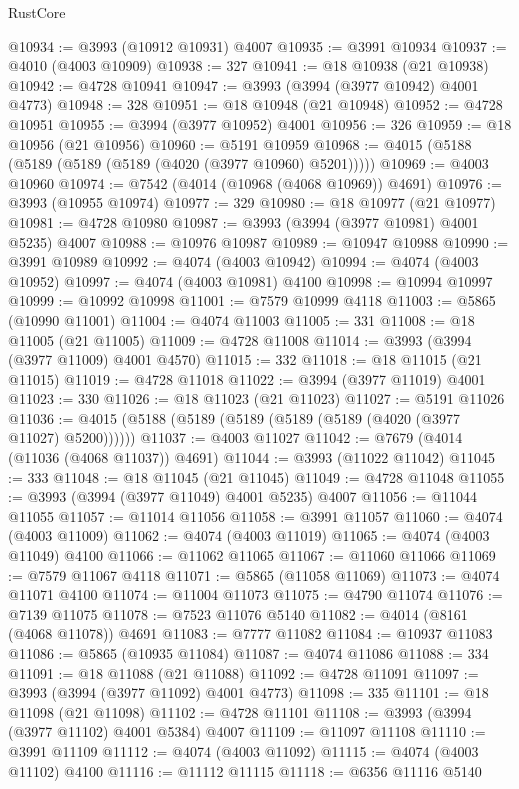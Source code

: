 \begin{lexlean}{RustCore}
\begin{coremodule}
@10934 := @3993 (@10912 @10931) @4007
@10935 := @3991 @10934
@10937 := @4010 (@4003 @10909)
@10938 := 327
@10941 := @18 @10938 (@21 @10938)
@10942 := @4728 @10941
@10947 := @3993 (@3994 (@3977 @10942) @4001 @4773)
@10948 := 328
@10951 := @18 @10948 (@21 @10948)
@10952 := @4728 @10951
@10955 := @3994 (@3977 @10952) @4001
@10956 := 326
@10959 := @18 @10956 (@21 @10956)
@10960 := @5191 @10959
@10968 := @4015 (@5188 (@5189 (@5189 (@5189 (@4020 (@3977 @10960) @5201)))))
@10969 := @4003 @10960
@10974 := @7542 (@4014 (@10968 (@4068 @10969)) @4691)
@10976 := @3993 (@10955 @10974)
@10977 := 329
@10980 := @18 @10977 (@21 @10977)
@10981 := @4728 @10980
@10987 := @3993 (@3994 (@3977 @10981) @4001 @5235) @4007
@10988 := @10976 @10987
@10989 := @10947 @10988
@10990 := @3991 @10989
@10992 := @4074 (@4003 @10942)
@10994 := @4074 (@4003 @10952)
@10997 := @4074 (@4003 @10981) @4100
@10998 := @10994 @10997
@10999 := @10992 @10998
@11001 := @7579 @10999 @4118
@11003 := @5865 (@10990 @11001)
@11004 := @4074 @11003
@11005 := 331
@11008 := @18 @11005 (@21 @11005)
@11009 := @4728 @11008
@11014 := @3993 (@3994 (@3977 @11009) @4001 @4570)
@11015 := 332
@11018 := @18 @11015 (@21 @11015)
@11019 := @4728 @11018
@11022 := @3994 (@3977 @11019) @4001
@11023 := 330
@11026 := @18 @11023 (@21 @11023)
@11027 := @5191 @11026
@11036 := @4015 (@5188 (@5189 (@5189 (@5189 (@5189 (@4020 (@3977 @11027) @5200))))))
@11037 := @4003 @11027
@11042 := @7679 (@4014 (@11036 (@4068 @11037)) @4691)
@11044 := @3993 (@11022 @11042)
@11045 := 333
@11048 := @18 @11045 (@21 @11045)
@11049 := @4728 @11048
@11055 := @3993 (@3994 (@3977 @11049) @4001 @5235) @4007
@11056 := @11044 @11055
@11057 := @11014 @11056
@11058 := @3991 @11057
@11060 := @4074 (@4003 @11009)
@11062 := @4074 (@4003 @11019)
@11065 := @4074 (@4003 @11049) @4100
@11066 := @11062 @11065
@11067 := @11060 @11066
@11069 := @7579 @11067 @4118
@11071 := @5865 (@11058 @11069)
@11073 := @4074 @11071 @4100
@11074 := @11004 @11073
@11075 := @4790 @11074
@11076 := @7139 @11075
@11078 := @7523 @11076 @5140
@11082 := @4014 (@8161 (@4068 @11078)) @4691
@11083 := @7777 @11082
@11084 := @10937 @11083
@11086 := @5865 (@10935 @11084)
@11087 := @4074 @11086
@11088 := 334
@11091 := @18 @11088 (@21 @11088)
@11092 := @4728 @11091
@11097 := @3993 (@3994 (@3977 @11092) @4001 @4773)
@11098 := 335
@11101 := @18 @11098 (@21 @11098)
@11102 := @4728 @11101
@11108 := @3993 (@3994 (@3977 @11102) @4001 @5384) @4007
@11109 := @11097 @11108
@11110 := @3991 @11109
@11112 := @4074 (@4003 @11092)
@11115 := @4074 (@4003 @11102) @4100
@11116 := @11112 @11115
@11118 := @6356 @11116 @5140

\end{coremodule}
\end{lexlean}
